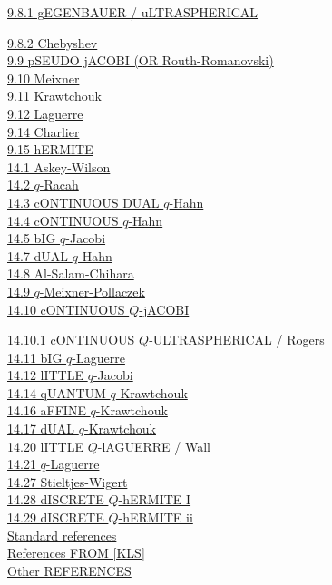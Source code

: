 \documentclass[twoside,11pt]{article}
\newcommand\sa{\smallskipamount}
\newcommand\sLP{\\[\sa]}
\begin{document}
\hyperref[sec9.8.1]{9.8.1 gEGENBAUER / uLTRASPHERICAL} 
 
\hyperref[sec9.8.2]{9.8.2 Chebyshev}\\ 
\hyperref[sec9.9]{9.9 pSEUDO jACOBI (OR Routh-Romanovski)}\\ 
\hyperref[sec9.10]{9.10 Meixner}\\ 
\hyperref[sec9.11]{9.11 Krawtchouk}\\ 
\hyperref[sec9.12]{9.12 Laguerre}\\ 
\hyperref[sec9.14]{9.14 Charlier}\\ 
\hyperref[sec9.15]{9.15 hERMITE} 
\sLP 
\hyperref[sec14.1]{14.1 Askey-Wilson}\\ 
\hyperref[sec14.2]{14.2 $q$-Racah}\\ 
\hyperref[sec14.3]{14.3 cONTINUOUS DUAL $q$-Hahn}\\ 
\hyperref[sec14.4]{14.4 cONTINUOUS $q$-Hahn}\\ 
\hyperref[sec14.5]{14.5 bIG $q$-Jacobi}\\ 
\hyperref[sec14.7]{14.7 dUAL $q$-Hahn}\\ 
\hyperref[sec14.8]{14.8 Al-Salam-Chihara}\\ 
\hyperref[sec14.9]{14.9 $q$-Meixner-Pollaczek}\\ 
\hyperref[sec14.10]{14.10 cONTINUOUS $Q$-jACOBI} 
 
\hyperref[sec14.10.1]{14.10.1 cONTINUOUS $Q$-ULTRASPHERICAL / Rogers}\\ 
\hyperref[sec14.11]{14.11 bIG $q$-Laguerre}\\ 
\hyperref[sec14.12]{14.12 lITTLE $q$-Jacobi}\\ 
\hyperref[sec14.14]{14.14 qUANTUM $q$-Krawtchouk}\\ 
\hyperref[sec14.16]{14.16 aFFINE $q$-Krawtchouk}\\ 
\hyperref[sec14.17]{14.17 dUAL $q$-Krawtchouk}\\ 
\hyperref[sec14.20]{14.20 lITTLE $Q$-lAGUERRE / Wall}\\ 
\hyperref[sec14.21]{14.21 $q$-Laguerre}\\ 
\hyperref[sec14.27]{14.27 Stieltjes-Wigert}\\ 
\hyperref[sec14.28]{14.28 dISCRETE $Q$-hERMITE I}\\ 
\hyperref[sec14.29]{14.29 dISCRETE $Q$-hERMITE ii} 
\sLP 
\hyperref[sec_ref1]{Standard references}\\ 
\hyperref[sec_ref2]{References FROM [KLS]}\\ 
\hyperref[sec_ref3]{Other REFERENCES} 
% 
\newpage 
% 
\end{document}
